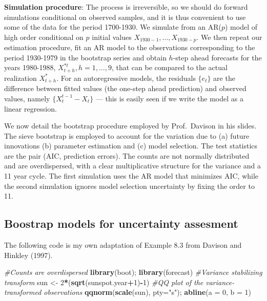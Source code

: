 \documentclass[]{book}
\newenvironment{Shaded}{\begin{snugshade}}{\end{snugshade}}
\newcommand{\CommentTok}[1]{\textcolor[rgb]{0.56,0.35,0.01}{\textit{#1}}}
\newcommand{\DataTypeTok}[1]{\textcolor[rgb]{0.13,0.29,0.53}{#1}}
\newcommand{\DecValTok}[1]{\textcolor[rgb]{0.00,0.00,0.81}{#1}}
\newcommand{\KeywordTok}[1]{\textcolor[rgb]{0.13,0.29,0.53}{\textbf{#1}}}
\newcommand{\NormalTok}[1]{#1}
\newcommand{\OperatorTok}[1]{\textcolor[rgb]{0.81,0.36,0.00}{\textbf{#1}}}
\newcommand{\StringTok}[1]{\textcolor[rgb]{0.31,0.60,0.02}{#1}}
\begin{document}
\textbf{Simulation procedure}: The process is irreversible, so we should
do forward simulations conditional on observed samples, and it is thus
convenient to use some of the data for the period 1700-1930. We simulate
from an AR(\(p\)) model of high order conditional on \(p\) initial
values \(X_{1930-1}, \ldots, X_{1930-p}\). We then repeat our estimation
procedure, fit an AR model to the observations corresponding to the
period 1930-1979 in the bootstrap series and obtain \(h\)-step ahead
forecasts for the years 1980-1988, \(X_{t+h}^{*t}, h=1, \ldots, 9\),
that can be compared to the actual realization \(X^{*}_{t+h}\). For an
autoregressive models, the residuals \(\{e_{t}\}\) are the difference
between fitted values (the one-step ahead prediction) and observed
values, namely \(\{X_{t}^{t-1}-X_{t}\}\) --- this is easily seen if we
write the model as a linear regression.

We now detail the bootstrap procedure employed by Prof.~Davison in his
slides. The sieve bootstrap is employed to account for the variation due
to (a) future innovations (b) parameter estimation and (c) model
selection. The test statistics are the pair (AIC, prediction errors).
The counts are not normally distributed and are overdispersed, with a
clear multiplicative structure for the variance and a 11 year cycle. The
first simulation uses the AR model that minimizes AIC, while the second
simulation ignores model selection uncertainty by fixing the order to
11.

\hypertarget{boostrap-models-for-uncertainty-assesment}{%
\subsection{Boostrap models for uncertainty
assesment}\label{boostrap-models-for-uncertainty-assesment}}

The following code is my own adaptation of Example 8.3 from Davison and
Hinkley (1997).

\begin{Shaded}
\begin{Highlighting}[]
\CommentTok{#Counts are overdispersed}
\KeywordTok{library}\NormalTok{(boot); }\KeywordTok{library}\NormalTok{(forecast)}
\CommentTok{#Variance stabilizing transform}
\NormalTok{sun <-}\StringTok{ }\DecValTok{2}\OperatorTok{*}\NormalTok{(}\KeywordTok{sqrt}\NormalTok{(sunspot.year}\OperatorTok{+}\DecValTok{1}\NormalTok{)}\OperatorTok{-}\DecValTok{1}\NormalTok{)}
\CommentTok{#QQ plot of the variance-transformed observations}
\KeywordTok{qqnorm}\NormalTok{(}\KeywordTok{scale}\NormalTok{(sun), }\DataTypeTok{pty=}\StringTok{"s"}\NormalTok{); }\KeywordTok{abline}\NormalTok{(}\DataTypeTok{a =} \DecValTok{0}\NormalTok{, }\DataTypeTok{b =} \DecValTok{1}\NormalTok{)}
\end{Highlighting}
\end{Shaded}
\end{document}
